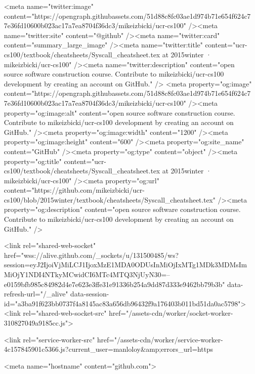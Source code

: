       <meta name="twitter:image" content="https://opengraph.githubassets.com/51d88c8fc03ae1d974b71e654f624c77e36fd10600b023ac17a7ea8704f36dc3/mikeizbicki/ucr-cs100" /><meta name="twitter:site" content="@github" /><meta name="twitter:card" content="summary_large_image" /><meta name="twitter:title" content="ucr-cs100/textbook/cheatsheets/Syscall_cheatsheet.tex at 2015winter · mikeizbicki/ucr-cs100" /><meta name="twitter:description" content="open source software construction course. Contribute to mikeizbicki/ucr-cs100 development by creating an account on GitHub." />
  <meta property="og:image" content="https://opengraph.githubassets.com/51d88c8fc03ae1d974b71e654f624c77e36fd10600b023ac17a7ea8704f36dc3/mikeizbicki/ucr-cs100" /><meta property="og:image:alt" content="open source software construction course. Contribute to mikeizbicki/ucr-cs100 development by creating an account on GitHub." /><meta property="og:image:width" content="1200" /><meta property="og:image:height" content="600" /><meta property="og:site_name" content="GitHub" /><meta property="og:type" content="object" /><meta property="og:title" content="ucr-cs100/textbook/cheatsheets/Syscall_cheatsheet.tex at 2015winter · mikeizbicki/ucr-cs100" /><meta property="og:url" content="https://github.com/mikeizbicki/ucr-cs100/blob/2015winter/textbook/cheatsheets/Syscall_cheatsheet.tex" /><meta property="og:description" content="open source software construction course. Contribute to mikeizbicki/ucr-cs100 development by creating an account on GitHub." />
  


      <link rel="shared-web-socket" href="wss://alive.github.com/_sockets/u/131500485/ws?session=eyJ2IjoiVjMiLCJ1IjoxMzE1MDA0ODUsInMiOjIxMTg1MDk3MDMsImMiOjY1NDI4NTkyMCwidCI6MTc4MTQ3NjUyN30=--e0159bfb985c84982d4e7e623e3ffe31e91336b254a9dd87d333e9462bb79b3b" data-refresh-url="/_alive" data-session-id="a3ba91f623bb0737f4a8145ac83a656db96432f9a176403b011bd51da0ac5798">
      <link rel="shared-web-socket-src" href="/assets-cdn/worker/socket-worker-310827049a9185cc.js">

      <link rel="service-worker-src" href="/assets-cdn/worker/service-worker-4c157845901c5366.js?current_user=manloloy&amp;errors_url=https%

      <meta name="hostname" content="github.com">


